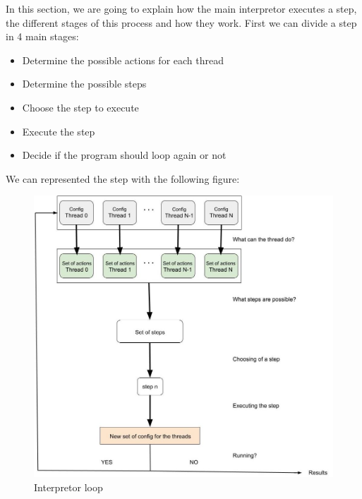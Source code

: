 \documentclass[11pt]{report}
\begin{document}
\newpage

{}
\vspace*{3pt}
\vspace*{10pt}

\tabto{1cm}In this section, we are going to explain how the main interpretor executes a step, the different stages of this process and how they work. First we can divide a step in 4 main stages:
\begin{itemize}
    \item Determine the possible actions for each thread
    \item Determine the possible steps
    \item Choose the step to execute
    \item Execute the step
    \item Decide if the program should loop again or not
\end{itemize}

\vspace*{3pt}
We can represented the step with the following figure:

\begin{figure}[htbp]
\centering
\includegraphics[scale = 0.4]{Interpretor_loop.jpg}
\caption{Interpretor loop}
\end{figure}
\end{document}
